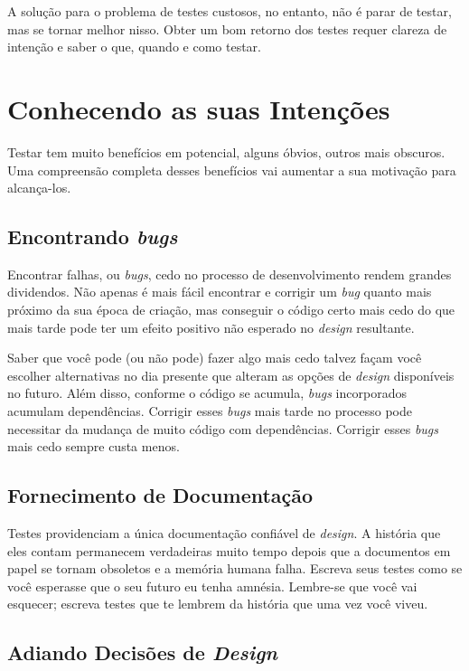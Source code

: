 A solução para o problema de testes custosos, no entanto, não é parar de testar, mas se tornar melhor nisso. Obter um bom retorno dos testes requer clareza de intenção e saber o que, quando e como testar.

\section{Conhecendo as suas Intenções}

Testar tem muito benefícios em potencial, alguns óbvios, outros mais obscuros. Uma compreensão completa desses benefícios vai aumentar a sua motivação para alcança-los.

\subsection{Encontrando \textit{bugs}}

Encontrar falhas, ou \textit{bugs}, cedo no processo de desenvolvimento rendem grandes dividendos. Não apenas é mais fácil encontrar e corrigir um \textit{bug} quanto mais próximo da sua época de criação, mas conseguir o código certo mais cedo do que mais tarde pode ter um efeito positivo não esperado no \textit{design} resultante.

Saber que você pode (ou não pode) fazer algo mais cedo talvez façam você escolher alternativas no dia presente que alteram as opções de \textit{design} disponíveis no futuro. Além disso, conforme o código se acumula, \textit{bugs} incorporados acumulam dependências. Corrigir esses \textit{bugs} mais tarde no processo pode necessitar da mudança de muito código com dependências. Corrigir esses \textit{bugs} mais cedo sempre custa menos.

\subsection{Fornecimento de Documentação}

Testes providenciam a única documentação confiável de \textit{design}. A história que eles contam permanecem verdadeiras muito tempo depois que a documentos em papel se tornam obsoletos e a memória humana falha. Escreva seus testes como se você esperasse que o seu futuro eu tenha amnésia. Lembre-se que você vai esquecer; escreva testes que te lembrem da história que uma vez você viveu.

\subsection{Adiando Decisões de \textit{Design}}

